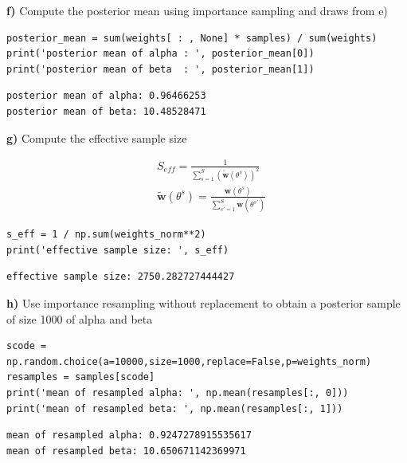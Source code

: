 \documentclass{article}
\begin{document}
\textbf{f)} Compute the posterior mean using importance sampling and draws from e)

\begin{verbatim}    
posterior_mean = sum(weights[ : , None] * samples) / sum(weights)
print('posterior mean of alpha : ', posterior_mean[0])
print('posterior mean of beta  : ', posterior_mean[1])
 \end{verbatim}
 
\begin{verbatim}
posterior mean of alpha: 0.96466253 
posterior mean of beta: 10.48528471
\end{verbatim}
 
 \textbf{g)} Compute the effective sample size
 
\begin{equation}
\begin{aligned}
&S_{eff}=\frac{1}{\sum^S_{s=1}(\tilde{\mathbf{w}}(\theta^s))^2}\\
&\tilde{\mathbf{w}}(\theta^s)=\frac{\mathbf{w}(\theta^s)}{\sum^S_{s'=1}\mathbf{w}(\theta^{s'})}
\end{aligned}
\end{equation}
\begin{verbatim} 
s_eff = 1 / np.sum(weights_norm**2)
print('effective sample size: ', s_eff)
\end{verbatim}

\begin{verbatim}
effective sample size: 2750.282727444427
\end{verbatim}
 
\textbf{h)} Use importance resampling without replacement to obtain a posterior sample of size 1000 of alpha and beta 

\begin{verbatim}
scode = np.random.choice(a=10000,size=1000,replace=False,p=weights_norm)
resamples = samples[scode]
print('mean of resampled alpha: ', np.mean(resamples[:, 0]))
print('mean of resampled beta: ', np.mean(resamples[:, 1]))
\end{verbatim}

\begin{verbatim}
mean of resampled alpha: 0.9247278915535617
mean of resampled beta: 10.650671142369971
\end{verbatim}
\end{document}
